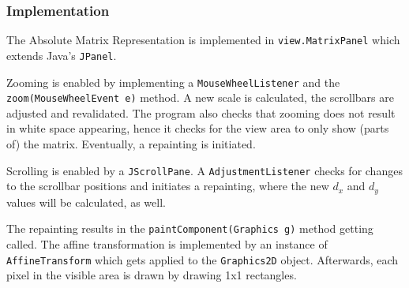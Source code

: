 \newpage
\subsubsection{Implementation}
The Absolute Matrix Representation is implemented in \texttt{view.MatrixPanel} which extends Java's \texttt{JPanel}.

Zooming is enabled by implementing a \texttt{MouseWheelListener} and the \\
\texttt{zoom(MouseWheelEvent e)} method. A new scale is calculated, the scrollbars are adjusted and revalidated. The program also checks that zooming does not result in white space appearing, hence it checks for the view area to only show (parts of) the matrix. Eventually, a repainting is initiated. 

Scrolling is enabled by a \texttt{JScrollPane}. A \texttt{AdjustmentListener} checks for changes to the scrollbar positions and initiates a repainting, where the new $d_{x}$ and $d_{y}$ values will be calculated, as well.

The repainting results in the \texttt{paintComponent(Graphics g)} method getting called. The affine transformation is implemented by an instance of \\
\texttt{AffineTransform} which gets applied to the \texttt{Graphics2D} object. Afterwards, each pixel in the visible area is drawn by drawing 1x1 rectangles.